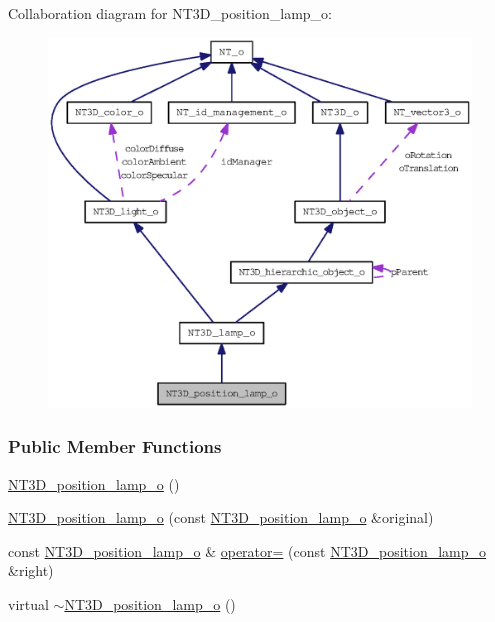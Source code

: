 Collaboration diagram for NT3D\_\-position\_\-lamp\_\-o:
\nopagebreak
\begin{figure}[H]
\begin{center}
\leavevmode
\includegraphics[width=400pt]{class_n_t3_d__position__lamp__o__coll__graph}
\end{center}
\end{figure}
\subsubsection*{Public Member Functions}
\begin{DoxyCompactItemize}
\item 
\hyperlink{class_n_t3_d__position__lamp__o_ad52df09f127663aa167fedbee2f3708f}{NT3D\_\-position\_\-lamp\_\-o} ()
\item 
\hyperlink{class_n_t3_d__position__lamp__o_a9fdff48b826fbba4bf79efd5aee54b2d}{NT3D\_\-position\_\-lamp\_\-o} (const \hyperlink{class_n_t3_d__position__lamp__o}{NT3D\_\-position\_\-lamp\_\-o} \&original)
\item 
const \hyperlink{class_n_t3_d__position__lamp__o}{NT3D\_\-position\_\-lamp\_\-o} \& \hyperlink{class_n_t3_d__position__lamp__o_a85ab2e5f0a72e34e6b114101950a96c3}{operator=} (const \hyperlink{class_n_t3_d__position__lamp__o}{NT3D\_\-position\_\-lamp\_\-o} \&right)
\item 
virtual \hyperlink{class_n_t3_d__position__lamp__o_a7f62b51bf101e35500834042dd8a20e6}{$\sim$NT3D\_\-position\_\-lamp\_\-o} ()
\end{DoxyCompactItemize}
